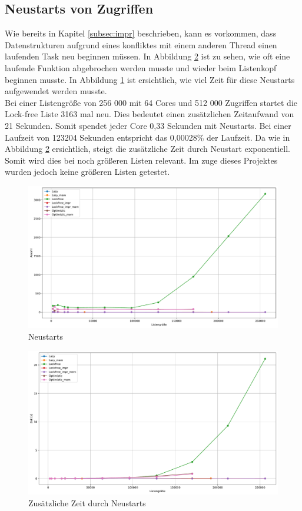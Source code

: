 \subsection{Neustarts von Zugriffen}
Wie bereits in Kapitel \ref{subsec:impr} beschrieben, kann es vorkommen, dass Datenstrukturen aufgrund eines konfliktes mit einem anderen
Thread einen laufenden Task neu beginnen müssen. 
In Abbildung \ref{fig:mixed_lostTime} ist zu sehen, wie oft eine laufende Funktion abgebrochen werden musste und wieder beim Listenkopf beginnen musste. 
In Abbildung \ref{fig:mixed_goToStart} ist ersichtlich, wie viel Zeit für diese Neustarts aufgewendet werden musste. \\
Bei einer Listengröße von 256 000 mit 64 Cores und 512 000 Zugriffen startet die Lock-free Liste 3163 mal neu. Dies bedeutet
einen zusätzlichen Zeitaufwand von 21 Sekunden. Somit spendet jeder Core 0,33 Sekunden mit Neustarts. Bei einer Laufzeit von 123204 Sekunden 
entspricht das 0,00028\% der Laufzeit. Da wie in Abbildung \ref{fig:mixed_lostTime} ersichtlich, steigt die zusätzliche Zeit durch Neustart exponentiell.
Somit wird dies bei noch größeren Listen relevant. Im zuge dieses Projektes wurden jedoch keine größeren Listen getestet. 

\begin{figure}[ht!]
	\centering
	\includegraphics[width=1.0\linewidth]{./plots_pdf/mixed_goToStart.pdf} 
	\caption{Neustarts}
	\label{fig:mixed_goToStart} 
\end{figure}

\begin{figure}[ht!]
	\centering
	\includegraphics[width=1.0\linewidth]{./plots_pdf/mixed_lostTime.pdf} 
	\caption{Zusätzliche Zeit durch Neustarts}
	\label{fig:mixed_lostTime} 
\end{figure}


